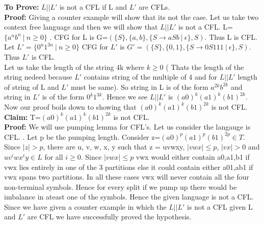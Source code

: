 \documentclass{article}
\begin{document}
\textbf{To Prove:} $L|| L'$ is not a CFL if L and $L'$ are CFLs. \\
\textbf{Proof:} Giving a counter example will show that its not the case. Let us take two context free language and then we will show that $L || L'$ is not a CFL. L=$\{a^nb^n \ | \ n \geq 0\}$ . CFG for L is G=$(\{S\},\{a,b\},\{S \rightarrow aSb \ | \ \epsilon\},S)$. Thus L is CFL. Let $ L'=\{0^n1^{3n} \ | \ n \geq 0\}$ CFG for $L'$ is $G' =(\{S\},\{0,1\},\{S \rightarrow 0S111 \ | \ \epsilon\},S)$. Thus $L'$ is CFL.\\
Let us take the length of the string 4k where $k \geq 0$ ( Thats the length of the string nedeed because $L'$ contains string of the multiple of 4 and for $L || L'$ length of string of L and $L'$ must be same). So string in L is of the form $a^{2k}b^{2k}$ and string in $L' $ is of the form $0^{k}1^{3k}$. Hence we see $L || L'$ is $(a0)^k (a1)^k (b1)^{2k}$. Now our proof boils down to showing that $(a0)^k (a1)^k (b1)^{2k}$ is not CFL.\\
\textbf{Claim:} T=$(a0)^k (a1)^k (b1)^{2k}$ is not CFL.\\
\textbf{Proof:} We will use pumping lemma for CFL's. Let us consider the langauge is CFL. . Let p be the pumping length. Consider z=$(a0)^p (a1)^p (b1)^{2p} \in T$. Since $|z| > p$, there are u, v, w, x, y such that z = uvwxy, $|vwx| \leq p$, $|vx| > 0$ and $ uv^{i}wx^{i}y \in L$ for all $i \geq 0$. Since $|vwx| \leq p$ vwx would either contain a0,a1,b1 if vwx lies entirely in one of the 3 partitions else it could contain either a01,ab1 if vwx spans two partitions. In all these cases vwx will never contain all the four non-terminal symbols. Hence for every split if we pump up there would be imbalance in ateast one of the symbols. Hence the given language is not a CFL. \\
\newline
Since we have given a counter example in which the $L||L'$ is not a CFL given L and $L'$ are CFL we have successfully proved the hypothesis. 


\pagebreak
\end{document}
